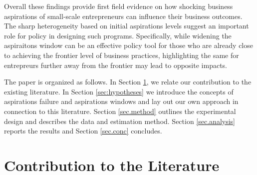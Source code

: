\documentclass[11.5pt]{article}
\begin{document}
Overall these findings provide first field evidence on how shocking business aspirations of small-scale entrepreneurs can influence their business outcomes. The sharp heterogeneity based on initial aspirations levels suggest an important role for policy in designing such programs. Specifically, while widening the aspiraitons window can be an effective policy tool for those who are already close to achieving the frontier level of business practices, highlighting the same for entrepreurs further away from the frontier may lead to opposite impacts. 

The paper is organized as follows. In Section \ref{sec:cont}, we relate our contribution to the existing literature. In Section \ref{sec:hypotheses} we introduce the concepts of aspirations failure and aspirations windows and lay out our own approach in connection to this literature. Section \ref{sec.method} outlines the experimental design and \label{sec.data} describes the data and estimation method. Section \ref{sec.analysis} reports the results and Section \ref{sec.conc} concludes.

\section{Contribution to the Literature} \label{sec:cont}
\end{document}

